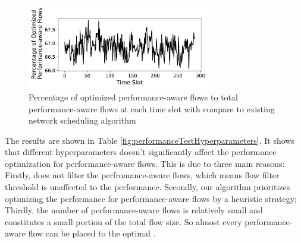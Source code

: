 \begin{figure}
	\centering
	\includegraphics[width = 8cm]{figs/evaluation/performanceTestPrecent.pdf}
	\caption{\small Percentage of optimized performance-aware flows to total performance-aware flows at each time slot with {\sys} compare to existing network scheduling algorithm}
	\label{fig:performanceTestPrecent}
\end{figure}


The results are shown in Table \ref{fig:performanceTestHyperparameters}. It shows that different hyperparameters doesn't significantly affect the performance optimization for performance-aware flows. This is due to three main reasons: Firstly, {\sys} does not filter the perfromance-aware flows, which means flow filter threshold is unaffected to the performance. Secondly, our algorithm prioritizes optimizing the performance for performance-aware flows by a heuristic strategy; Thirdly, the number of performance-aware flows is relatively small and constitutes a small portion of the total flow size. So almost every performance-aware flow can be placed to the optimal {\egress}.

